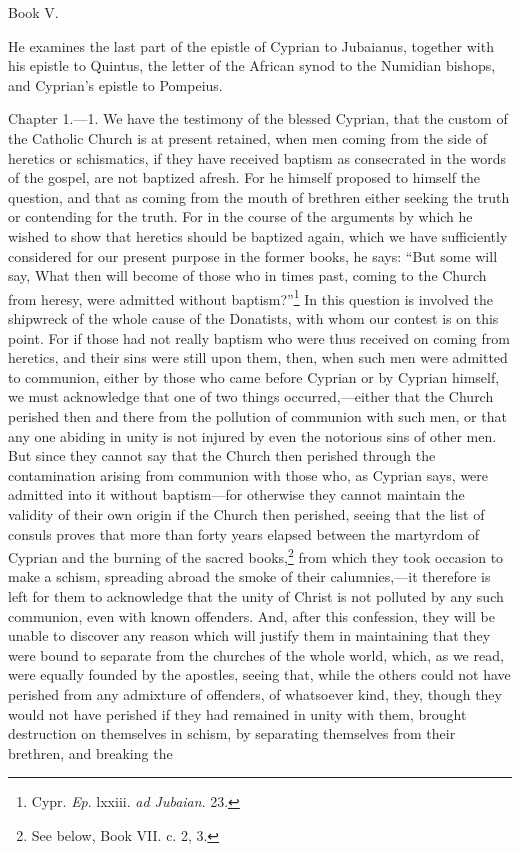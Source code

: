 
Book V.

He examines the last part of the epistle of Cyprian to Jubaianus, together with his epistle to Quintus, the letter of the African synod to the Numidian bishops, and Cyprian’s epistle to Pompeius.


Chapter 1.—1. We have the testimony of the blessed Cyprian, that the custom of the Catholic Church is at present retained, when men coming from the side of heretics or schismatics, if they have received baptism as consecrated in the words of the gospel, are not baptized afresh. For he himself proposed to himself the question, and that as coming from the mouth of brethren either seeking the truth or contending for the truth. For in the course of the arguments by which he wished to show that heretics should be baptized again, which we have sufficiently considered for our present purpose in the former books, he says: ``But some will say, What then will become of those who in times past, coming to the Church from heresy, were admitted without baptism?''\footnote{\par  Cypr. \emph{Ep}. lxxiii. \emph{ad Jubaian}. 23.} In this question is involved the shipwreck of the whole cause of the Donatists, with whom our contest is on this point. For if those had not really baptism who were thus received on coming from heretics, and their sins were still upon them, then, when such men were admitted to communion, either by those who came before Cyprian or by Cyprian himself, we must acknowledge that one of two things occurred,—either that the Church perished then and there from the pollution of communion with such men, or that any one abiding in unity is not injured by even the notorious sins of other men. But since they cannot say that the Church then perished through the contamination arising from communion with those who, as Cyprian says, were admitted into it without baptism—for otherwise they cannot maintain the validity of their own origin if the Church then perished, seeing that the list of consuls proves that more than forty years elapsed between the martyrdom of Cyprian and the burning of the sacred books,\footnote{\par  See below, Book VII. c. 2, 3.} from which they took occasion to make a schism, spreading abroad the smoke of their calumnies,—it therefore is left for them to acknowledge that the unity of Christ is not polluted by any such communion, even with known offenders. And, after this confession, they will be unable to discover any reason which will justify them in maintaining that they were bound to separate from the churches of the whole world, which, as we read, were equally founded by the apostles, seeing that, while the others could not have perished from any admixture of offenders, of whatsoever kind, they, though they would not have perished if they had remained in unity with them, brought destruction on themselves in schism, by separating themselves from their brethren, and breaking the 